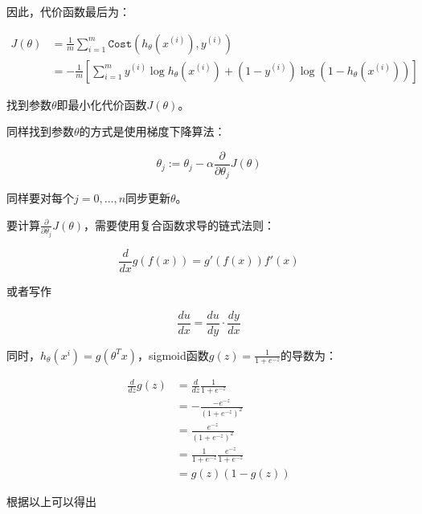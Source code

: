\documentclass[12pt, a4paper]{article}
\begin{document}
因此，代价函数最后为：

\begin{align*}
    J(\theta) & = \frac{1}{m}\sum^{m}_{i=1}\mathtt{Cost}(h_\theta(x^{(i)}), y^{(i)})                                            \\
              & = -\frac{1}{m}\left[\sum^{m}_{i=1}y^{(i)}\log h_\theta(x^{(i)}) + (1 - y^{(i)})\log(1-h_\theta(x^{(i)}))\right]
\end{align*}

找到参数$\theta$即最小化代价函数$J(\theta)$。

同样找到参数$\theta$的方式是使用梯度下降算法：

\begin{equation*}
    \theta_j:=\theta_j-\alpha\frac{\partial}{\partial\theta_j}J(\theta)
\end{equation*}

同样要对每个$j=0,\dots,n$同步更新$\theta$。

要计算$\frac{\partial}{\partial\theta_j}J(\theta)$，需要使用复合函数求导的链式法则：

\begin{equation*}
    \frac{d}{dx}g(f(x)) = g'(f(x))f'(x)
\end{equation*}

或者写作

\begin{equation*}
    \frac{du}{dx} = \frac{du}{dy}\cdot\frac{dy}{dx}
\end{equation*}

同时，$h_\theta(x^i) = g(\theta^Tx)$，sigmoid函数$g(z) = \frac{1}{1+e^{-z}}$的导数为：

\begin{align*}
    \frac{d}{dz}g(z) & = \frac{d}{dz}\frac{1}{1+e^{-z}}            \\
                     & = -\frac{-e^{-z}}{(1+e^{-z})^2}             \\
                     & = \frac{e^{-z}}{(1+e^{-z})^2}               \\
                     & = \frac{1}{1+e^{-z}}\frac{e^{-z}}{1+e^{-z}} \\
                     & = g(z)(1-g(z))
\end{align*}

根据以上可以得出
\end{document}
